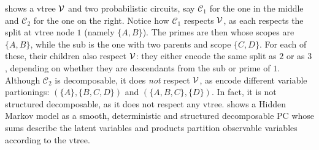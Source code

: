  shows a vtree $\operatorname{\mathcal{V}}$ and two probabilistic circuits, say
$\mathcal{C}_1$ for the one in the middle and $\mathcal{C}_2$ for the one on the right. Notice how
$\mathcal{C}_1$ respects $\operatorname{\mathcal{V}}$, as each \inode[fill=boxred!70]{\newProdNode} respects the split
at vtree node $1$ (namely $\{A,B\}$). The primes are then \inode[fill=boxpurple!60]{\newSumNode}
whose scopes are $\{A,B\}$, while the sub is the one with two parents and scope $\{C,D\}$. For each
of these, their children \inode[fill=boxbrown!60]{\newProdNode} also respect $\operatorname{\mathcal{V}}$: they either
encode the same split as $2$ or as $3$, depending on whether they are descendants from the sub or
prime of $1$. Although $\mathcal{C}_2$ is decomposable, it does \emph{not} respect $\operatorname{\mathcal{V}}$, as
\inode[fill=boxred!70]{\newProdNode} encode different variable partionings: $(\{A\},\{B,C,D\})$ and
$(\{A,B,C\},\{D\})$. In fact, it is not structured decomposable, as it does not respect any vtree.
 shows a Hidden Markov model as a smooth, deterministic and structured decomposable PC
whose sums describe the latent variables and products partition observable variables according to
the vtree.

